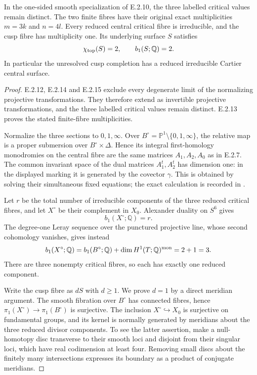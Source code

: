 \begin{proposition}
In the one-sided smooth specialization of E.2.10,
the three labelled critical values remain distinct.
The two finite fibres have their original exact
multiplicities $m=3k$ and $n=4l$.  Every reduced
central critical fibre is irreducible, and the
cusp fibre has multiplicity one.  Its underlying
surface $S$ satisfies
\[
 \chi_{\rm top}(S)=2,\qquad b_1(S;\mathbb Q)=2.
\]
In particular the unresolved cusp completion has
a reduced irreducible Cartier central surface.
\end{proposition}
\begin{proof}
E.2.12, E.2.14 and E.2.15 exclude every degenerate
limit of the normalizing projective transformations.
They therefore extend as invertible projective
transformations, and the three labelled critical
values remain distinct.  E.2.13 proves the stated
finite-fibre multiplicities.

Normalize the three sections to $0,1,\infty$.
Over $B^\circ=\mathbb P^1\setminus\{0,1,\infty\}$,
the relative map is a proper submersion over
$B^\circ\times\Delta$.  Hence its integral
first-homology monodromies on the central fibre
are the same matrices $A_1,A_2,A_0$ as in
E.2.7.  The common invariant space of the dual
matrices $A_1^t,A_2^t$ has dimension one:
in the displayed marking it is generated by
the covector $\gamma$.  This is obtained by
solving their simultaneous fixed equations;
the exact calculation is recorded in
.

Let $r$ be the total number of irreducible
components of the three reduced critical
fibres, and let $X^\circ$ be their complement
in $X_0$.  Alexander duality on $S^6$ gives
\[
 b_1(X^\circ;\mathbb Q)=r.
\]
The degree-one Leray sequence over the
punctured projective line, whose second
cohomology vanishes, gives instead
\[
 b_1(X^\circ;\mathbb Q)
 =b_1(B^\circ;\mathbb Q)
   +\dim H^1(T;\mathbb Q)^{\rm mon}
 =2+1=3.
\]
There are three nonempty critical fibres,
so each has exactly one reduced component.

Write the cusp fibre as $dS$ with $d\ge1$.
We prove $d=1$ by a direct meridian argument.
The smooth fibration over $B^\circ$ has
connected fibres, hence
$\pi_1(X^\circ)\to\pi_1(B^\circ)$ is
surjective.  The inclusion
$X^\circ\hookrightarrow X_0$ is surjective
on fundamental groups, and its kernel is
normally generated by meridians about the
three reduced divisor components.  To see
the latter assertion, make a null-homotopy
disc transverse to their smooth loci and
disjoint from their singular loci, which
have real codimension at least four.
Removing small discs about the finitely
many intersections expresses its boundary
as a product of conjugate meridians.


\end{proof}
